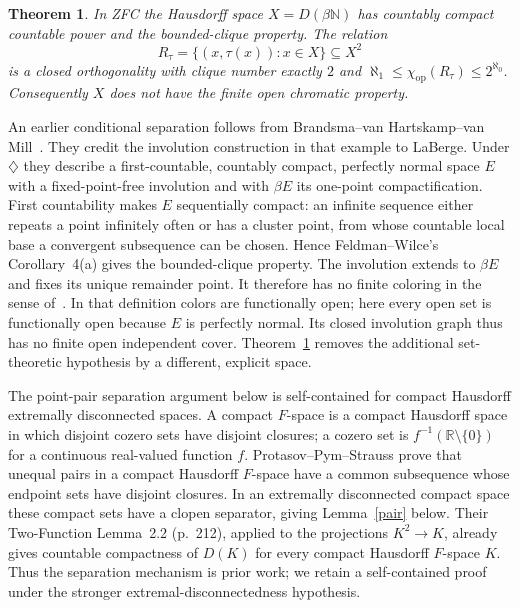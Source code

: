\documentclass[11pt]{article}
\newtheorem{theorem}{Theorem}
\newcommand{\N}{\mathbb N}
\newcommand{\DS}[1]{D(#1)}
\newcommand{\op}{\mathrm{op}}
\begin{document}
\begin{theorem}\label{main}
In ZFC the Hausdorff space $X=\DS{\beta\N}$ has countably compact
countable power and the bounded-clique property. The relation
\[
 R_\tau=\{(x,\tau(x)):x\in X\}\subseteq X^2
\]
is a closed orthogonality with clique number exactly $2$ and
$\aleph_1\le\chi_\op(R_\tau)\le 2^{\aleph_0}$. Consequently $X$ does not have the
finite open chromatic property.
\end{theorem}

An earlier conditional separation follows from Brandsma--van
Hartskamp--van Mill~\cite[Example~2.3, pp.~28--29]{BHM}.
They credit the involution construction in that example to LaBerge.
Under $\diamondsuit$ they describe a first-countable, countably compact,
perfectly normal space $E$ with a fixed-point-free involution and with
$\beta E$ its one-point compactification. First countability makes $E$
sequentially compact: an infinite sequence either repeats a point
infinitely often or has a cluster point, from whose countable local
base a convergent subsequence can be chosen. Hence Feldman--Wilce's
Corollary~4(a) gives the bounded-clique property. The involution extends
to $\beta E$ and fixes its unique remainder point. It therefore has no
finite coloring in the sense of~\cite[pp.~25--26]{BHM}. In that definition
colors are functionally open; here every open set is functionally open
because $E$ is perfectly normal. Its closed involution graph thus has
no finite open independent cover. Theorem~\ref{main} removes the
additional set-theoretic hypothesis by a different, explicit space.

The point-pair separation argument below is self-contained for compact
Hausdorff extremally disconnected spaces. A compact $F$-space is a compact
Hausdorff space in which disjoint cozero sets have disjoint closures;
a cozero set is $f^{-1}(\mathbb R\setminus\{0\})$ for a continuous
real-valued function $f$. Protasov--Pym--Strauss
\cite[Lemma~2.1, p.~211]{PPS} prove that unequal pairs in a compact
Hausdorff $F$-space have a common subsequence whose endpoint sets have
disjoint closures. In an extremally disconnected compact space these
compact sets have a clopen separator, giving Lemma~\ref{pair} below.
Their Two-Function Lemma~2.2 (p.~212), applied to the projections
$K^2\to K$, already gives countable compactness of $D(K)$ for every
compact Hausdorff $F$-space $K$. Thus the separation mechanism is prior
work; we retain a self-contained proof under the stronger
extremal-disconnectedness hypothesis.
\end{document}
